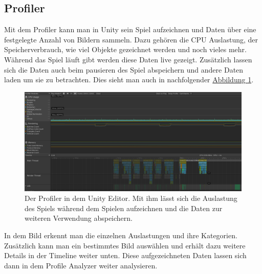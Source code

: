 \subsection{Profiler}
Mit dem Profiler kann man in Unity sein Spiel aufzeichnen und Daten über eine festgelegte Anzahl von Bildern sammeln. Dazu gehören die CPU Auslastung, der Speicherverbrauch, wie viel Objekte gezeichnet werden und noch vieles mehr. Während das Spiel läuft gibt werden diese Daten live gezeigt. Zusätzlich lassen sich die Daten auch beim pausieren des Spiel abspeichern und andere Daten laden um sie zu betrachten. Dies sieht man auch in nachfolgender \hyperref[fig:profiler]{Abbildung \ref*{fig:profiler}}. 
\begin{figure}[H]
\centering
\includegraphics[scale=0.428]{Bilder/Profiler.png}
\caption{Der Profiler in dem Unity Editor. Mit ihm lässt sich die Auslastung des Spiels während dem Spielen aufzeichnen und die Daten zur weiteren Verwendung abspeichern.}
\label{fig:profiler}
\end{figure}
In dem Bild erkennt man die einzelnen Auslastungen und ihre Kategorien. Zusätzlich kann man ein bestimmtes Bild auswählen und erhält dazu weitere Details in der Timeline weiter unten. Diese aufgezeichneten Daten lassen sich dann in dem Profile Analyzer weiter analysieren.
